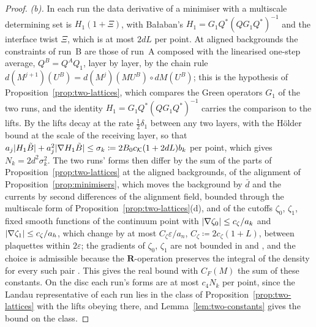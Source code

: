\documentclass[11pt]{preprint}
\DeclarePairedDelimiter{\abs}{\lvert}{\rvert}
\numberwithin{equation}{section}
\theoremstyle{definition}
\theoremstyle{remark}
\theoremstyle{plain}
\begin{document}
\begin{proof}
\emph{(b).} In each run the data derivative of a minimiser with a multiscale determining set is $H_1(1 + \Xi)$, with Ba{\l}aban's $H_1 = G_1Q^*(QG_1Q^*)^{-1}$ \cite[(3.129)]{BalabanPBG} and the interface twist $\Xi$, which is at most $2dL$ per point. At aligned backgrounds the constraints of run~B are those of run~A composed with the linearised one-step average, $Q^B = Q^AQ_1$, layer by layer, by the chain rule $d(M^{j+1})(U^B) = d(M^j)(MU^B) \circ dM(U^B)$; this is the hypothesis of Proposition~\ref{prop:two-lattices}, which compares the Green operators $G_1$ of the two runs, and the identity $H_1 = G_1Q^*(QG_1Q^*)^{-1}$ carries the comparison to the lifts. By \cite[Theorem~3.12, (3.132)--(3.133), pp.~422--423]{BalabanPBG} the lifts decay at the rate $\frac12\delta_1$ between any two layers, with the H\"older bound at the scale of the receiving layer, so that $a_j\abs{H_1\tilde B} + a_j^2\abs{\nabla H_1\tilde B} \leq \sigma_k \coloneqq 2B_0c_{\mathcal K}(1 + 2dL)b_k$ per point, which gives $N_k = 2d^2\sigma_k^2$. The two runs' forms then differ by the sum of the parts of Proposition~\ref{prop:two-lattices} at the aligned backgrounds, of the alignment of Proposition~\ref{prop:minimisers}, which moves the background by $\bar d$ and the currents by second differences of the alignment field, bounded through the multiscale form of Proposition~\ref{prop:two-lattices}(d), and of the cutoffs $\zeta_0$, $\zeta_1$, fixed smooth functions of the continuum point with $\abs{\nabla\zeta_0} \leq c_\zeta/a_k$ and $\abs{\nabla\zeta_1} \leq c_\zeta/a_h$, which change by at most $C_\zeta\varepsilon/a_n$, $C_\zeta \coloneqq 2c_\zeta(1 + L)$, between plaquettes within $2\varepsilon$; the gradients of $\zeta_0$, $\zeta_1$ are not bounded in \cite[p.~201]{BalabanLFR1} and \cite[p.~360]{BalabanLFR2}, and the choice is admissible because the $\mathbf R$-operation preserves the integral of the density for every such pair \cite[(0.4), p.~176]{BalabanLFR1}. This gives the real bound with $C_F(M)$ the sum of these constants. On the disc each run's forms are at most $c_4N_k$ per point, since the Landau representative of each run lies in the class of Proposition~\ref{prop:two-lattices} with the lifts obeying \cite[(3.133)]{BalabanPBG} there, and Lemma~\ref{lem:two-constants} gives the bound on the class.


\end{proof}
\end{document}
